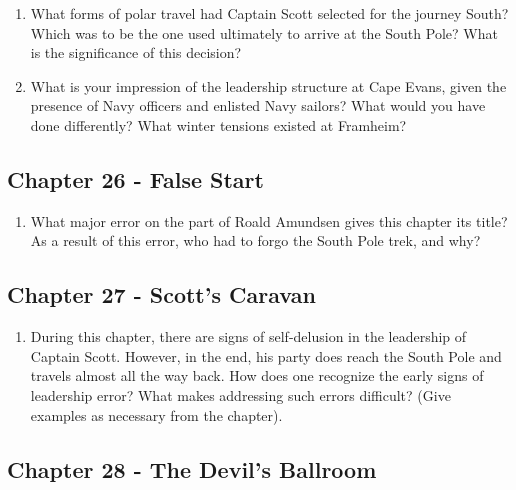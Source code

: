\documentclass[10pt]{article}
\begin{document}
\begin{enumerate}
\item What forms of polar travel had Captain Scott selected for the journey South?  Which was to be the one used ultimately to arrive at the South Pole?  What is the significance of this decision? \\ \vspace{1.5cm}
\item What is your impression of the leadership structure at Cape Evans, given the presence of Navy officers and enlisted Navy sailors?  What would you have done differently?  What winter tensions existed at Framheim? \\ \vspace{1.5cm}
\end{enumerate}

\subsection{Chapter 26 - False Start}

\begin{enumerate}
\item What major error on the part of Roald Amundsen gives this chapter its title?  As a result of this error, who had to forgo the South Pole trek, and why? \\ \vspace{1.5cm}
\end{enumerate}

\subsection{Chapter 27 - Scott's Caravan}

\begin{enumerate}
\item During this chapter, there are signs of self-delusion in the leadership of Captain Scott.  However, in the end, his party does reach the South Pole and travels almost all the way back.  How does one recognize the early signs of leadership error?  What makes addressing such errors difficult?  (Give examples as necessary from the chapter). \\ \vspace{1.5cm}
\end{enumerate}

\subsection{Chapter 28 - The Devil's Ballroom}
\end{document}
